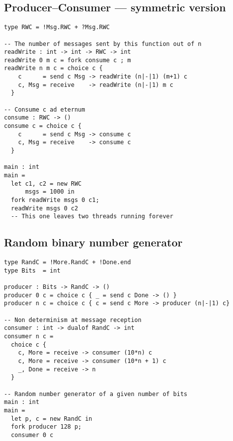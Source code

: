 \documentclass{article}
\begin{document}
\subsection{Producer--Consumer --- symmetric version}
\vspace{2cm}
\begin{lstlisting}
type RWC = !Msg.RWC + ?Msg.RWC
  
-- The number of messages sent by this function out of n
readWrite : int -> int -> RWC -> int
readWrite 0 m c = fork consume c ; m
readWrite n m c = choice c {
    c      = send c Msg -> readWrite (n|-|1) (m+1) c
    c, Msg = receive    -> readWrite (n|-|1) m c
  }

-- Consume c ad eternum
consume : RWC -> () 
consume c = choice c {
    c      = send c Msg -> consume c
    c, Msg = receive    -> consume c
  }

main : int
main =
  let c1, c2 = new RWC
      msgs = 1000 in
  fork readWrite msgs 0 c1;
  readWrite msgs 0 c2
  -- This one leaves two threads running forever
  \end{lstlisting}
  \newpage
  \subsection{Random binary number generator}
  \vspace{2cm}
  \begin{lstlisting}
type RandC = !More.RandC + !Done.end
type Bits  = int

producer : Bits -> RandC -> ()
producer 0 c = choice c { _ = send c Done -> () }
producer n c = choice c { c = send c More -> producer (n|-|1) c}

-- Non determinism at message reception
consumer : int -> dualof RandC -> int
consumer n c =
  choice c {
    c, More = receive -> consumer (10*n) c
    c, More = receive -> consumer (10*n + 1) c
    _, Done = receive -> n
  }

-- Random number generator of a given number of bits
main : int
main =
  let p, c = new RandC in
  fork producer 128 p;
  consumer 0 c
  \end{lstlisting}
\end{document}
